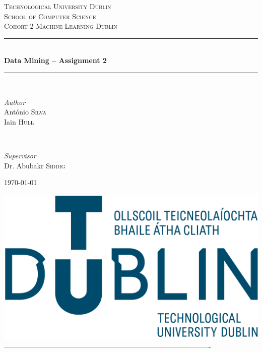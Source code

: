 \begin{titlepage}
	\newcommand{\HRule}{\rule{\linewidth}{0.5mm}} 
	\center 
	\textsc{\LARGE Technological University Dublin
}\\[1.5cm]
	\textsc{\Large School of Computer Science}\\[0.5cm] 
	\textsc{\large Cohort 2 Machine Learning Dublin}\\[0.5cm] 
	\HRule\\[0.4cm]
	
	{\huge\bfseries Data Mining -- Assignment 2}\\[0.4cm]
	\HRule\\[1.5cm]
	
	\begin{minipage}{0.4\textwidth}
		\begin{flushleft}
			\large
			\textit{Author}\\
			António \textsc{Silva} \\
			Iain \textsc{Hull}
		\end{flushleft}
	\end{minipage}
	~
	\begin{minipage}{0.4\textwidth}
		\begin{flushright}
			\large
			\textit{Supervisor}\\
			Dr. Abubakr \textsc{Siddig}
		\end{flushright}
	\end{minipage}

	\vfill\vfill\vfill 
	
	{\large\today} 
	
	
	\vfill\vfill
	\includegraphics[width=0.25\linewidth]{img/cover/tudublinlogo.png}\\[1cm] 
 ----------------------------------------------------------------------------------------
	\vfill 	
\end{titlepage}
\thispagestyle{empty}
\newpage
\maketitle
\thispagestyle{empty}
\newpage
\thispagestyle{empty}
\tableofcontents
\newpage
 \thispagestyle{empty}
\listoffigures
\listoftables
\lstlistoflistings
\newpage



